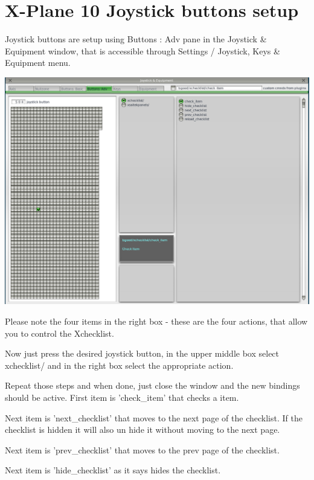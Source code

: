 \documentclass[11pt,parskip=half,a4paper]{scrartcl}
\begin{document}
\newpage
\section{X-Plane 10 Joystick buttons setup}

Joystick buttons are setup using Buttons : Adv pane in the Joystick \& Equipment window, that is accessible through Settings / Joystick, Keys \& Equipment menu.

\begin{center}
\includegraphics[width=17cm]{XchecklistUserManual-img001.png}
\end{center}

Please note the four items in the right box - these are the four actions, that allow you to control the Xchecklist. \newline

Now just press the desired joystick button, in the upper middle box select xchecklist/ and in the right 
box select the appropriate action. \newline

Repeat those steps and when done, just close the window and the new bindings should be active. 
First item is 'check\_item' that checks a item. 

\newpage
Next item is 'next\_checklist' that moves to the next page of the checklist. If the checklist is hidden it 
will also un hide it without moving to the next page. 

Next item is 'prev\_checklist' that moves to the prev page of the checklist.

Next item is 'hide\_checklist' as it says hides the checklist.
\end{document}

